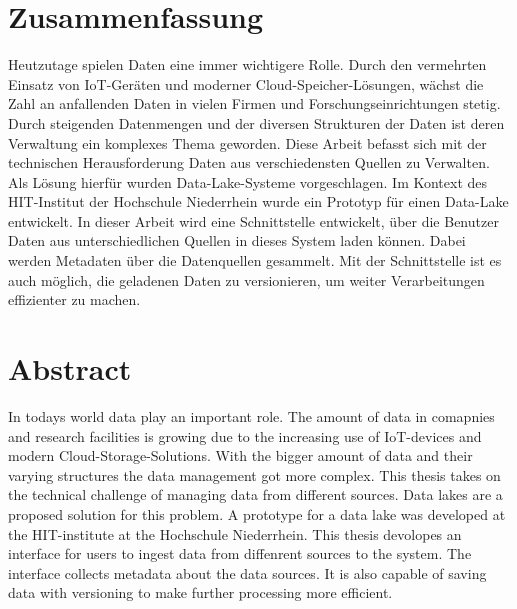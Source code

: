 \section*{Zusammenfassung}

Heutzutage spielen Daten eine immer wichtigere Rolle.
Durch den vermehrten Einsatz von IoT-Geräten und moderner Cloud-Speicher-Lösungen, wächst die Zahl an anfallenden Daten in vielen Firmen und Forschungseinrichtungen stetig.
Durch steigenden Datenmengen und der diversen Strukturen der Daten ist deren Verwaltung ein komplexes Thema geworden.
Diese Arbeit befasst sich mit der technischen Herausforderung Daten aus verschiedensten Quellen zu Verwalten.
Als Lösung hierfür wurden Data-Lake-Systeme vorgeschlagen.
Im Kontext des HIT-Institut der Hochschule Niederrhein wurde ein Prototyp für einen Data-Lake entwickelt.
In dieser Arbeit wird eine Schnittstelle entwickelt, über die Benutzer Daten aus unterschiedlichen Quellen in dieses System laden können.
Dabei werden Metadaten über die Datenquellen gesammelt.
Mit der Schnittstelle ist es auch möglich, die geladenen Daten zu versionieren, um weiter Verarbeitungen effizienter zu machen.

\section*{Abstract}

In todays world data play an important role.
The amount of data in comapnies and research facilities is growing due to the increasing use of IoT-devices and modern Cloud-Storage-Solutions.
With the bigger amount of data and their varying structures the data management got more complex.
This thesis takes on the technical challenge of managing data from different sources.
Data lakes are a proposed solution for this problem.
A prototype for a data lake was developed at the HIT-institute at the Hochschule Niederrhein.
This thesis devolopes an interface for users to ingest data from diffenrent sources to the system.
The interface collects metadata about the data sources.
It is also capable of saving data with versioning to make further processing more efficient.